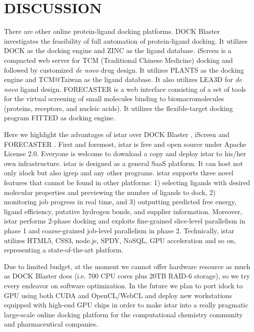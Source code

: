 \documentclass[12pt]{article}
\begin{document}
\section*{\sffamily \Large DISCUSSION}

There are other online protein-ligand docking platforms. DOCK Blaster \citep{557} investigates the feasibility of full automation of protein-ligand docking. It utilizes DOCK \citep{1222} as the docking engine and ZINC \citep{532,1178} as the ligand database. iScreen \citep{899} is a compacted web server for TCM (Traditional Chinese Medicine) docking and followed by customized \textit{de novo} drug design. It utilizes PLANTS \citep{610,607,779} as the docking engine and TCM@Taiwan \citep{528} as the ligand database. It also utilizes LEA3D \citep{1223} for \textit{de novo} ligand design. FORECASTER \citep{1012} is a web interface consisting of a set of tools for the virtual screening of small molecules binding to biomacromolecules (proteins, receptors, and nucleic acids). It utilizes the flexible-target docking program FITTED \citep{602} as docking engine.

Here we highlight the advantages of istar over DOCK Blaster \citep{557}, iScreen \citep{899} and FORECASTER \citep{1012}. First and foremost, istar is free and open source under Apache License 2.0. Everyone is welcome to download a copy and deploy istar to his/her own infrastructure. istar is designed as a general SaaS platform. It can host not only idock but also igrep and any other programs. istar supports three novel features that cannot be found in other platforms: 1) selecting ligands with desired molecular properties and previewing the number of ligands to dock, 2) monitoring job progress in real time, and 3) outputting predicted free energy, ligand efficiency, putative hydrogen bonds, and supplier information. Moreover, istar performs 2-phase docking and exploits fine-grained slice-level parallelism in phase 1 and coarse-grained job-level parallelism in phase 2. Technically, istar utilizes HTML5, CSS3, node.js, SPDY, NoSQL, GPU acceleration and so on, representing a state-of-the-art platform.

Due to limited budget, at the moment we cannot offer hardware resource as much as DOCK Blaster does (i.e. 700 CPU cores plus 20TB RAID-6 storage), so we try every endeavor on software optimization. In the future we plan to port idock to GPU using both CUDA and OpenCL/WebCL and deploy new workstations equipped with high-end GPU chips in order to make istar into a really pragmatic large-scale online docking platform for the computational chemistry community and pharmaceutical companies.
\end{document}
